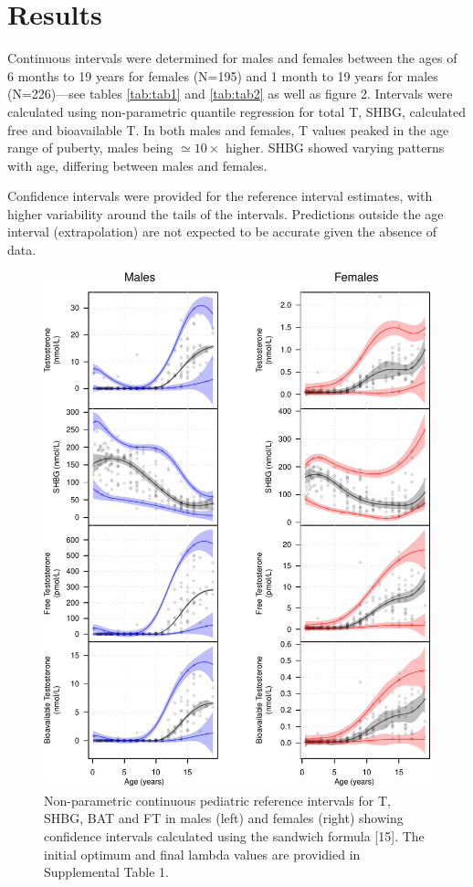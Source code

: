 \documentclass[]{elsarticle} %
\begin{document}
\hypertarget{results}{%
\section{Results}\label{results}}

Continuous intervals were determined for males and females between the
ages of 6 months to 19 years for females (N=195) and 1 month to 19 years
for males (N=226)---see tables \ref{tab:tab1} and \ref{tab:tab2} as well
as figure 2. Intervals were calculated using non-parametric quantile
regression for total T, SHBG, calculated free and bioavailable T. In
both males and females, T values peaked in the age range of puberty,
males being \(\simeq 10 \times\) higher. SHBG showed varying patterns
with age, differing between males and females.

Confidence intervals were provided for the reference interval estimates,
with higher variability around the tails of the intervals. Predictions
outside the age interval (extrapolation) are not expected to be accurate
given the absence of data.

\begin{figure}[H]
\includegraphics{quantregfitsfig2-1} \caption{\label{fig:fig2}Non-parametric continuous pediatric reference intervals for T, SHBG, BAT and FT in males (left) and females (right) showing confidence intervals calculated using the sandwich formula [15]. The initial optimum and final lambda values are providied in Supplemental Table 1.}\label{fig:quantregfitsfig2}
\end{figure}
\end{document}
